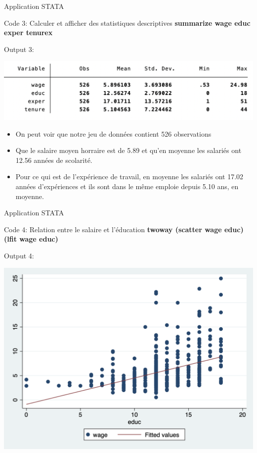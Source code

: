\documentclass{beamer}
\begin{document}
\begin{frame}{Application STATA}
\begin{block}{Code 3: Calculer et afficher des statistiques descriptives}
\textbf{summarize wage educ exper tenurex}
\end{block}
\begin{block}{Output 3:}
\begin{center}
\includegraphics[scale=.5]{summary}
\end{center}
\begin{itemize}
 \item On peut voir que notre jeu de données contient 526  observations 
 \item Que le salaire moyen horraire est de 5.89 et qu'en moyenne les salariés ont 12.56 années de scolarité. 
 \item Pour ce qui est de l'expérience de travail, en moyenne les salariés ont 17.02 années d'expériences et ils sont dans le même emploie depuis 5.10 ans, en moyenne.
\end{itemize}
\end{block}

\end{frame}


\begin{frame}{Application STATA}
\begin{block}{Code 4: Relation entre le salaire et l'éducation}
\textbf{twoway (scatter wage educ) (lfit wage educ)}
\end{block}

\begin{block}{Output 4:}
\begin{center}
\includegraphics[scale=.3]{PLOT_1.png}
\end{center}
\end{block}
\end{frame}
\end{document}
